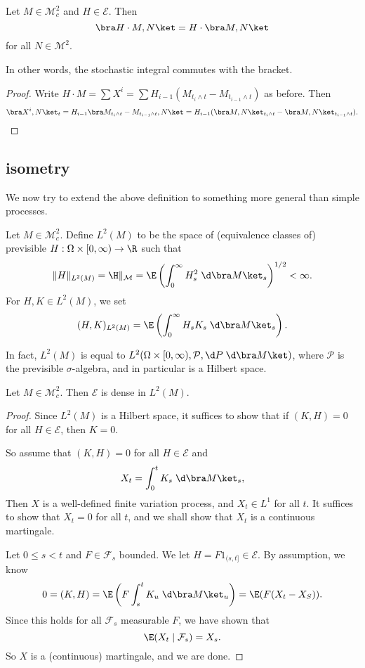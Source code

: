 \documentclass[a4paper]{article}
\begin{document}
\begin{prop}
  Let $M \in \mathcal{M}_c^2$ and $H \in \mathcal{E}$. Then
  \[
    \bra H \cdot M, N\ket = H \cdot \bra M, N\ket
  \]
  for all $N \in \mathcal{M}^2$.
\end{prop}
In other words, the stochastic integral commutes with the bracket.

\begin{proof}
  Write $H \cdot M = \sum X^i = \sum H_{i - 1}(M_{t_i \wedge t} - M_{t_{i - 1} \wedge t})$ as before. Then
  \[
    \bra X^i, N\ket_t = H_{i - 1}\bra M_{t_i \wedge t} - M_{t_{i - 1} \wedge t}, N\ket = H_{i - 1} (\bra M, N\ket_{t_i \wedge t} - \bra M, N\ket_{t_{i - 1}\wedge t}).\qedhere
  \]
\end{proof}

\subsection{ isometry}
We now try to extend the above definition to something more general than simple processes.
\begin{defi}[$L^2(M)$]
  Let $M \in \mathcal{M}_c^2$. Define $L^2(M)$ to be the space of (equivalence classes of) previsible $H: \Omega \times [0, \infty) \to \R$ such that
  \[
    \|H\|_{L^2(M)} = \H\|_{\mathcal{M}} = \E\left(\int_0^\infty H_s^2 \;\d \bra M\ket_s\right)^{1/2} < \infty.
  \]
  For $H, K \in L^2(M)$, we set
  \[
    (H, K)_{L^2(M)} = \E \left(\int_0^\infty H_s K_s \;\d \bra M\ket_s\right).
  \]
\end{defi}
In fact, $L^2(M)$ is equal to $L^2(\Omega \times [0, \infty), \mathcal{P}, \d P\;\d \bra M\ket)$, where $\mathcal{P}$ is the previsible $\sigma$-algebra, and in particular is a Hilbert space.

\begin{prop}
  Let $M \in \mathcal{M}_c^2$. Then $\mathcal{E}$ is dense in $L^2(M)$.
\end{prop}

\begin{proof}
  Since $L^2(M)$ is a Hilbert space, it suffices to show that if $(K, H) = 0$ for all $H \in \mathcal{E}$, then $K = 0$.

  So assume that $(K, H) = 0$ for all $H \in \mathcal{E}$ and
  \[
    X_t = \int_0^t K_s \;\d \bra M\ket_s,
  \]
  Then $X$ is a well-defined finite variation process, and $X_t \in L^1$ for all $t$. It suffices to show that $X_t = 0$ for all $t$, and we shall show that $X_t$ is a continuous martingale.

  Let $0 \leq s < t$ and $F \in \mathcal{F}_s$ bounded. We let $H = F 1_{(s, t]} \in \mathcal{E}$. By assumption, we know
  \[
    0 = (K, H) = \E \left(F \int_s^t K_u\; \d \bra M\ket_u\right) = \E (F (X_t - X_S)).
  \]
  Since this holds for all $\mathcal{F}_s$ measurable $F$, we have shown that
  \[
    \E(X_t \mid \mathcal{F}_s) = X_s.
  \]
  So $X$ is a (continuous) martingale, and we are done.
\end{proof}
\end{document}
